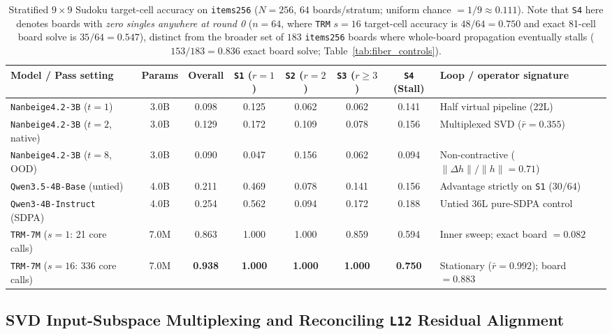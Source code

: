 \documentclass[10pt,letterpaper]{article}
\begin{document}
\begin{table}[t]
\centering
\small
\begin{tabularx}{\linewidth}{@{}lcccccc>{\raggedright\arraybackslash}X@{}}
\toprule
Model / Pass setting & Params & Overall & \texttt{S1} ($r{=}1$) & \texttt{S2} ($r{=}2$) & \texttt{S3} ($r{\ge}3$) & \texttt{S4} (Stall) & Loop / operator signature \\
\midrule
\texttt{Nanbeige4.2-3B} ($t=1$) & 3.0B & 0.098 & 0.125 & 0.062 & 0.062 & 0.141 & Half virtual pipeline (22L) \\
\texttt{Nanbeige4.2-3B} ($t=2$, native) & 3.0B & 0.129 & 0.172 & 0.109 & 0.078 & 0.156 & Multiplexed SVD ($\bar{r}=0.355$) \\
\texttt{Nanbeige4.2-3B} ($t=8$, OOD) & 3.0B & 0.090 & 0.047 & 0.156 & 0.062 & 0.094 & Non-contractive ($\|\Delta h\|/\|h\|=0.71$) \\
\texttt{Qwen3.5-4B-Base} (untied) & 4.0B & 0.211 & 0.469 & 0.078 & 0.141 & 0.156 & Advantage strictly on \texttt{S1} ($30/64$) \\
\texttt{Qwen3-4B-Instruct} (SDPA) & 4.0B & 0.254 & 0.562 & 0.094 & 0.172 & 0.188 & Untied 36L pure-SDPA control \\
\midrule
\texttt{TRM-7M} ($s=1$: 21 core calls) & 7.0M & 0.863 & 1.000 & 1.000 & 0.859 & 0.594 & Inner sweep; exact board $= 0.082$ \\
\texttt{TRM-7M} ($s=16$: 336 core calls) & 7.0M & \textbf{0.938} & \textbf{1.000} & \textbf{1.000} & \textbf{1.000} & \textbf{0.750} & Stationary ($\bar{r}=0.992$); board $= \mathbf{0.883}$ \\
\bottomrule
\end{tabularx}
\caption{Stratified $9\times 9$ Sudoku target-cell accuracy on \texttt{items256} ($N=256$, $64$ boards/stratum; uniform chance $= 1/9 \approx 0.111$). Note that \texttt{S4} here denotes boards with \emph{zero singles anywhere at round 0} ($n=64$, where \texttt{TRM} $s=16$ target-cell accuracy is $48/64 = 0.750$ and exact 81-cell board solve is $35/64 = 0.547$), distinct from the broader set of $183$ \texttt{items256} boards where whole-board propagation eventually stalls ($153/183 = 0.836$ exact board solve; Table~\ref{tab:fiber_controls}).}
\label{tab:sudoku_triangulation}
\end{table}

\subsection{SVD Input-Subspace Multiplexing and Reconciling \texttt{L12} Residual Alignment}\label{sec:svd_multiplex}
\end{document}
